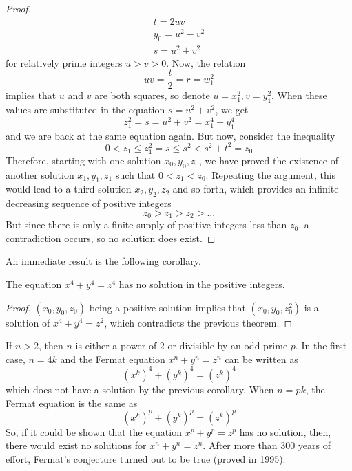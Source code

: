 \documentclass{article}
\newcounter{theorem}[section]
\begin{document}
\begin{proof}
\begin{align*}
    t = 2 uv \\
    y_0 = u^2 - v^2 \\
    s = u^2 + v^2
\end{align*}
for relatively prime integers $u>v>0$. Now, the relation 
\begin{equation}
  uv = \frac{t}{2} = r = w_1^2
\end{equation}
implies that $u$ and $v$ are both squares, so denote $u = x_1^2, v = y_1^2$. When these values are substituted in the equation $s = u^2 + v^2$, we get 
\begin{equation}
  z_1^2 = s = u^2 + v^2 = x_1^4 + y_1^4
\end{equation}
and we are back at the same equation again. But now, consider the inequality
\begin{equation}
  0<z_1 \leq z_1^2 = s \leq s^2 < s^2 + t^2 = z_0
\end{equation}
Therefore, starting with one solution $x_0, y_0, z_0$, we have proved the existence of another solution $x_1, y_1, z_1$ such that $0<z_1 < z_0$. Repeating the argument, this would lead to a third solution $x_2, y_2, z_2$ and so forth, which provides an infinite decreasing sequence of positive integers
\begin{equation}
  z_0 > z_1 > z_2 > ...
\end{equation}
But since there is only a finite supply of positive integers less than $z_0$, a contradiction occurs, so no solution does exist.   
\end{proof}

An immediate result is the following corollary. 

\begin{corollary}
  \label{thm:fermats-last-theorem-for-exponent-4}
The equation $x^4 + y^4 = z^4$ has no solution in the positive integers.
\end{corollary}
\begin{proof}
$(x_0, y_0, z_0)$ being a positive solution implies that $(x_0, y_0, z_0^2)$ is a solution of $x^4 + y^4 = z^2$, which contradicts the previous theorem. 
\end{proof}

If $n>2$, then $n$ is either a power of $2$ or divisible by an odd prime $p$. In the first case, $n=4k$ and the Fermat equation $x^n + y^n = z^n$ can be written as 
\begin{equation}
  (x^k)^4 + (y^k)^4 = (z^k)^4
\end{equation}
which does not have a solution by the previous corollary. When $n=pk$, the Fermat equation is the same as 
\begin{equation}
  (x^k)^p + (y^k)^p = (z^k)^p
\end{equation}
So, if it could be shown that the equation $x^p + y^p = z^p$ has no solution, then, there would exist no solutions for $x^n + y^n = z^n$. After more than 300 years of effort, Fermat's conjecture turned out to be true (proved in 1995). 
\end{document}
